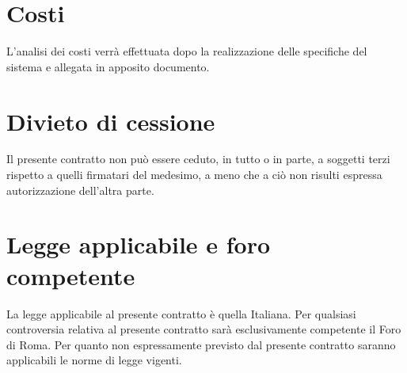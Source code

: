 \section{Costi} 
\label{sec:costi}
L'analisi dei costi verrà effettuata dopo la realizzazione delle specifiche del sistema e allegata in apposito documento.

\section{Divieto di cessione} 
\label{sec:divieto_di_cessione}
Il presente contratto non può essere ceduto, in tutto o in parte, a soggetti
terzi rispetto a quelli firmatari del medesimo, a meno che a ciò non risulti
espressa autorizzazione dell’altra parte.

\section{Legge applicabile e foro competente} 
\label{sec:legge_applicabile_e_foro_competente}
La legge applicabile al presente contratto è quella Italiana. Per qualsiasi
controversia relativa al presente contratto sarà esclusivamente competente il
Foro di Roma. Per quanto non espressamente previsto dal presente contratto
saranno applicabili le norme di legge vigenti.


